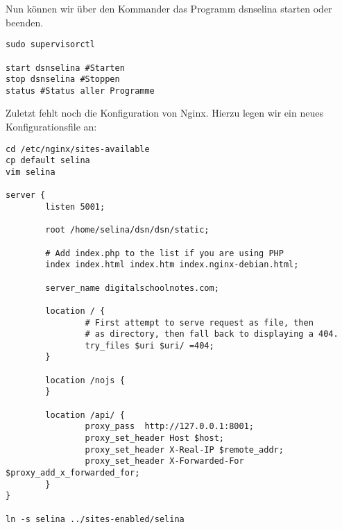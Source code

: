 \documentclass[12pt,a4paper,oneside,ngerman]{scrartcl}
\begin{document}
Nun können wir über den Kommander das Programm dsnselina starten oder beenden.
\begin{lstlisting}
sudo supervisorctl

start dsnselina #Starten
stop dsnselina #Stoppen
status #Status aller Programme
\end{lstlisting}

Zuletzt fehlt noch die Konfiguration von Nginx. Hierzu legen wir ein neues Konfigurationsfile an:
\begin{lstlisting}
cd /etc/nginx/sites-available
cp default selina
vim selina

server {
        listen 5001;

        root /home/selina/dsn/dsn/static;

        # Add index.php to the list if you are using PHP
        index index.html index.htm index.nginx-debian.html;

        server_name digitalschoolnotes.com;

        location / {
                # First attempt to serve request as file, then
                # as directory, then fall back to displaying a 404.
                try_files $uri $uri/ =404;
        }
        
        location /nojs {
        }

        location /api/ {
                proxy_pass  http://127.0.0.1:8001;
                proxy_set_header Host $host;
                proxy_set_header X-Real-IP $remote_addr;
                proxy_set_header X-Forwarded-For $proxy_add_x_forwarded_for;
        }
}

ln -s selina ../sites-enabled/selina

\end{lstlisting}



 



\end{document}

